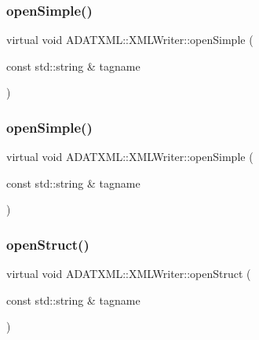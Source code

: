 \subsubsection{\texorpdfstring{openSimple()}{openSimple()}\hspace{0.1cm}{\footnotesize\ttfamily [1/2]}}
{\footnotesize\ttfamily virtual void A\+D\+A\+T\+X\+M\+L\+::\+X\+M\+L\+Writer\+::open\+Simple (\begin{DoxyParamCaption}\item[{const std\+::string \&}]{tagname }\end{DoxyParamCaption})\hspace{0.3cm}{\ttfamily [virtual]}}

\mbox{\label{classADATXML_1_1XMLWriter_a5599aaa358e07c8c7a4b7a137ec3e43a}} 
\subsubsection{\texorpdfstring{openSimple()}{openSimple()}\hspace{0.1cm}{\footnotesize\ttfamily [2/2]}}
{\footnotesize\ttfamily virtual void A\+D\+A\+T\+X\+M\+L\+::\+X\+M\+L\+Writer\+::open\+Simple (\begin{DoxyParamCaption}\item[{const std\+::string \&}]{tagname }\end{DoxyParamCaption})\hspace{0.3cm}{\ttfamily [virtual]}}

\mbox{\label{classADATXML_1_1XMLWriter_a8f9728743acfd9c15ab5d69bf8800a5e}} 
\subsubsection{\texorpdfstring{openStruct()}{openStruct()}\hspace{0.1cm}{\footnotesize\ttfamily [1/2]}}
{\footnotesize\ttfamily virtual void A\+D\+A\+T\+X\+M\+L\+::\+X\+M\+L\+Writer\+::open\+Struct (\begin{DoxyParamCaption}\item[{const std\+::string \&}]{tagname }\end{DoxyParamCaption})\hspace{0.3cm}{\ttfamily [virtual]}}



